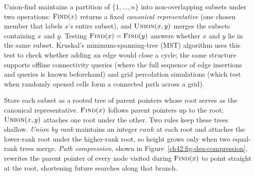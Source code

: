 Union-find maintains a partition of $\{1,\dots,n\}$ into non-overlapping subsets under two operations: $\textsc{Find}(x)$ returns a fixed \emph{canonical representative} (one chosen member that labels $x$'s entire subset), and $\textsc{Union}(x,y)$ merges the subsets containing $x$ and $y$. Testing $\textsc{Find}(x) = \textsc{Find}(y)$ answers whether $x$ and $y$ lie in the same subset. Kruskal's minimum-spanning-tree (MST) algorithm uses this test to check whether adding an edge would close a cycle; the same structure supports offline connectivity queries (where the full sequence of edge insertions and queries is known beforehand) and grid percolation simulations (which test when randomly opened cells form a connected path across a grid).

\begin{intuitionbox}
Store each subset as a rooted tree of parent pointers whose root serves as the canonical representative. $\textsc{Find}(x)$ follows parent pointers up to the root; $\textsc{Union}(x,y)$ attaches one root under the other. Two rules keep these trees shallow. \emph{Union by rank} maintains an integer $\textit{rank}$ at each root and attaches the lower-rank root under the higher-rank root, so height grows only when two equal-rank trees merge. \emph{Path compression}, shown in Figure~\ref{ch42:fig-dsu-compression}, rewrites the parent pointer of every node visited during $\textsc{Find}(x)$ to point straight at the root, shortening future searches along that branch.
\end{intuitionbox}

